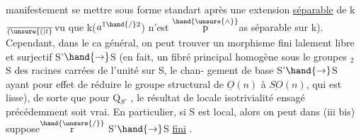 
manifestement se mettre sous forme standart après une extension \uline{séparable}
de k $\over{(}{\unsure{(|t}}$vu que k($a^{1\hand{/}2}$) n'est $\overset{\hand{\unsure{\wedge}}}{\mathrm{p}}$as séparable sur k). Cependant, dans le ca
 général, on peut trouver un morphisme fini  lalement
libre et surjectif S'$\hand{\to}$S (en fait, un fibré principal homogène sous
le  groupes \hand{$\mu$}$_{2}$ S  des racines carrées
 de l'unité sur S,\hand{--} le chan-%
gement de base S'$\hand{\to}$S ayant pour effet de réduire le groupe structural de
$\underline{O}(n)$ à $\underline{SO}(n)$, qui est lisse), de sorte que pour Q$_{S'}$ , le résultat de
locale isotrivialité ensagé précédemment soit vrai. En particulier, si
S est local, alors on peut dans (iii bis) suppose$\overset{\hand{\unsure{/}}}{\mathrm{r}}$ S'$\hand{\to}$S \uline{fini} .

